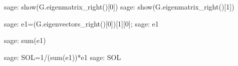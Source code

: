 \begin{sagecommandline}
    sage: show(G.eigenmatrix_right()[0])
    sage: show(G.eigenmatrix_right()[1])
\end{sagecommandline}
    
\begin{sagecommandline}
    sage: e1=(G.eigenvectors_right()[0])[1][0];
    sage: e1
\end{sagecommandline}
    
\begin{sagecommandline}
    sage: sum(e1)
\end{sagecommandline}
    
\begin{sagecommandline}
    sage: SOL=1/(sum(e1))*e1
    sage: SOL
\end{sagecommandline}